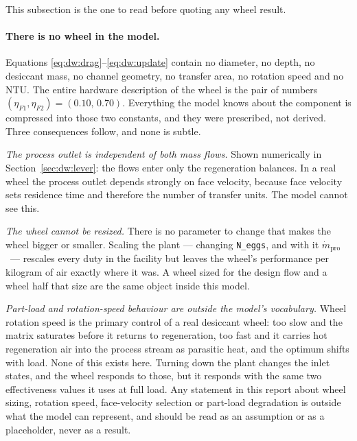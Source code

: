\documentclass[11pt]{article}
\newcommand{\mdp}{\ensuremath{\dot m_{\mathrm{pro}}}}
\begin{document}
This subsection is the one to read before quoting any wheel result.

\paragraph{There is no wheel in the model.} Equations
\eqref{eq:dw:drag}--\eqref{eq:dw:update} contain no diameter, no depth, no
desiccant mass, no channel geometry, no transfer area, no rotation speed and
no NTU. The entire hardware description of the wheel is the pair of numbers
$(\eta_{F1},\eta_{F2}) = (0.10,\,0.70)$. Everything the model knows about the
component is compressed into those two constants, and they were prescribed,
not derived. Three consequences follow, and none is subtle.

\emph{The process outlet is independent of both mass flows.} Shown
numerically in Section~\ref{sec:dw:lever}: the flows enter only the
regeneration balances. In a real wheel the process outlet depends strongly on
face velocity, because face velocity sets residence time and therefore the
number of transfer units. The model cannot see this.

\emph{The wheel cannot be resized.} There is no parameter to change that
makes the wheel bigger or smaller. Scaling the plant --- changing
\texttt{N\_eggs}, and with it \mdp\ --- rescales every duty in the facility
but leaves the wheel's performance per kilogram of air exactly where it was.
A wheel sized for the design flow and a wheel half that size are the same
object inside this model.

\emph{Part-load and rotation-speed behaviour are outside the model's
vocabulary.} Wheel rotation speed is the primary control of a real desiccant
wheel: too slow and the matrix saturates before it returns to regeneration,
too fast and it carries hot regeneration air into the process stream as
parasitic heat, and the optimum shifts with load. None of this exists here.
Turning down the plant changes the inlet states, and the wheel responds to
those, but it responds with the same two effectiveness values it uses at full
load. Any statement in this report about wheel sizing, rotation speed,
face-velocity selection or part-load degradation is outside what the model can
represent, and should be read as an assumption or as a placeholder, never as
a result.
\end{document}
